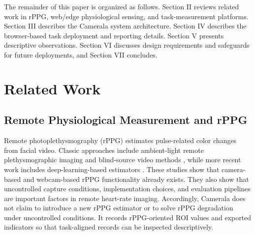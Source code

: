 \documentclass[dvipdfmx]{ehis}
\begin{document}
The remainder of this paper is organized as follows.
Section II reviews related work in rPPG, web/edge physiological sensing, and task-measurement platforms.
Section III describes the Camerala system architecture.
Section IV describes the browser-based task deployment and reporting details.
Section V presents descriptive observations.
Section VI discusses design requirements and safeguards for future deployments, and Section VII concludes.

\section{Related Work}

\subsection{Remote Physiological Measurement and rPPG}
Remote photoplethysmography (rPPG) estimates pulse-related color changes from facial video.
Classic approaches include ambient-light remote plethysmographic imaging and blind-source video methods \cite{verkruysse2008,poh_ica}, while more recent work includes deep-learning-based estimators \cite{deepphys}.
These studies show that camera-based and webcam-based rPPG functionality already exists.
They also show that uncontrolled capture conditions, implementation choices, and evaluation pipelines are important factors in remote heart-rate imaging.
Accordingly, Camerala does not claim to introduce a new rPPG estimator or to solve rPPG degradation under uncontrolled conditions.
It records rPPG-oriented ROI values and exported indicators so that task-aligned records can be inspected descriptively.
\end{document}
